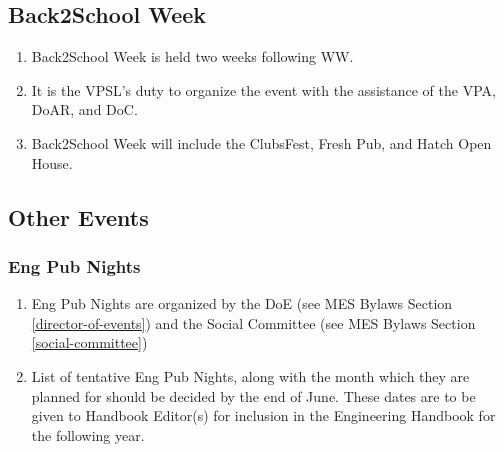 \subsection{Back2School Week}
\label{back2school-week}
\begin{enumerate}
 \item
  Back2School Week is held two weeks following WW.
 \item
  It is the VPSL's duty to organize the event with the assistance of the VPA, DoAR, and DoC.
 \item
  Back2School Week will include the ClubsFest, Fresh Pub, and Hatch Open House.
\end{enumerate}

\subsection{Other Events}
\label{other-events}

\subsubsection{Eng Pub Nights}
\label{eng-pub-nights}
\begin{enumerate}
 \item
  Eng Pub Nights are organized by the DoE (see MES Bylaws Section \ref{director-of-events}) and the Social Committee (see MES Bylaws Section \ref{social-committee})
 \item
  List of tentative Eng Pub Nights, along with the month which they are planned for should be decided by the end of June. These dates are to be given to Handbook Editor(s) for inclusion in the Engineering Handbook for the following year.
\end{enumerate}
